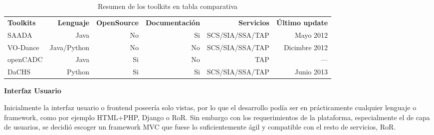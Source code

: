\begin{table}[ht]
\centering
\caption{Resumen de los toolkits en tabla comparativa}
\begin{tabular}{lrrrrr}
    {\bf Toolkits} & {\bf Lenguaje} & {\bf OpenSource} & {\bf Documentación} & {\bf Servicios} & {\bf Último update}  \\
    SAADA          & Java           & No               & Si                  & SCS/SIA/SSA/TAP & Mayo 2012     \\
    VO-Dance       & Java/Python    & No               & No                  & SCS/SIA/SSA/TAP & Dicimbre 2012 \\
    openCADC       & Java           & Si               & No                  & TAP             & ---           \\
    DaCHS          & Python         & Si               & Si                  & SCS/SIA/SSA/TAP & Junio 2013    \\
\end{tabular}
\label{table:toolkits}
\end{table}

\textbf{Interfaz Usuario}

Inicialmente la interfaz usuario o frontend poseería solo vistas, por lo que
el desarrollo podía ser en prácticamente cualquier lenguaje o framework, como por
ejemplo HTML+PHP, Django o RoR. Sin embargo con los requerimientos de la
plataforma, especialmente el de capa de usuarios, se decidió escoger un
framework MVC que fuese lo suficientemente ágil y compatible con el resto de
servicios, RoR.
